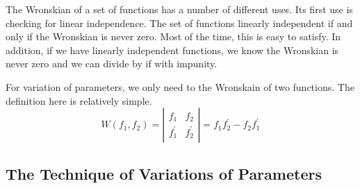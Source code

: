 \documentclass[fleqn,letterpaper]{report}
\begin{document}
The Wronskian of a set of functions has a number of different
uses. Its first use is checking for linear independence. The
set of functions linearly independent if and only if the
Wronskian is never zero. Most of the time, this is easy to
satisfy. In addition, if we have linearly independent
functions, we know the Wronskian is never zero and we can divide
by if with impunity.

For variation of parameters, we only need to the Wronskain of
two functions. The definition here is relatively simple.
\begin{equation*}
W(f_1,f_2) = \left| \begin{matrix} f_1 & f_2 \\ f_1^\prime &
f_2^\prime \end{matrix} \right| = f_1 f_2^\prime - f_2
f_1^\prime
\end{equation*}

\subsection{The Technique of Variations of Parameters}
\label{technique-vop}
\end{document}
